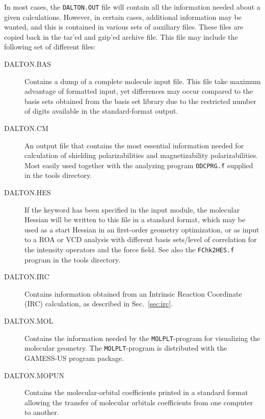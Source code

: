 In most cases, the \verb|DALTON.OUT| file will contain all the
information needed about a given calculations. However, in certain
cases, additional information may be wanted, and this is contained
in various sets of auxiliary files. These files are copied back in the
tar'ed and gzip'ed archive file. This file may include the following set of
different files:

\begin{description}
\item[DALTON.BAS] Contains a dump of a complete molecule input file.
 This file take maximum
advantage of formatted input, yet differences may occur compared to
the basis sets obtained from the basis set library due to the
restricted number of digits available in the standard-format output.

\item[DALTON.CM] An output file that contains the most essential
information needed for calculation of shielding polarizabilities
and magnetizability polarizabilities. Most easily used together
with the analyzing program \verb|ODCPRG.f| supplied in
the
tools directory.

\item[DALTON.HES] If the keyword  has been specified in
the  input module, the molecular Hessian
will be written
to this file in a standard format, which may be used as a start Hessian
in an first-order geometry
optimization, or as input to a ROA  or
VCD
analysis with different basis sets/level of correlation for the
intensity operators and the force field. See also the
\verb|FChk2HES.f| program in the tools directory.

\item[DALTON.IRC] Contains information obtained from an Intrinsic
Reaction Coordinate (IRC) calculation, as described in
Sec.~\ref{sec:irc}.

\item[DALTON.MOL] Contains the information needed by the
\verb|MOLPLT|-program for visualizing the molecular geometry. The
\verb|MOLPLT|-program is distributed with the GAMESS-US program
package.

\item[DALTON.MOPUN] Contains the molecular-orbital coefficients
printed in a standard format allowing the transfer of molecular
orbitals coefficients from one computer to another.


\end{description}
